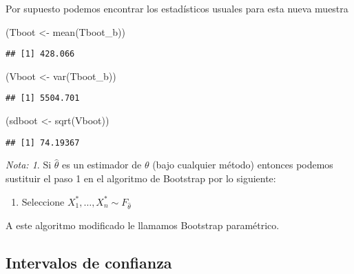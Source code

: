 \documentclass[
  12pt,
]{book}
\newenvironment{Shaded}{\begin{snugshade}}{\end{snugshade}}
\newcommand{\FunctionTok}[1]{\textcolor[rgb]{0.00,0.00,0.00}{#1}}
\newcommand{\NormalTok}[1]{#1}
\newcommand{\OtherTok}[1]{\textcolor[rgb]{0.56,0.35,0.01}{#1}}
\providecommand{\tightlist}{%
  \setlength{\itemsep}{0pt}\setlength{\parskip}{0pt}}
\theoremstyle{definition}
\theoremstyle{definition}
\theoremstyle{definition}
\theoremstyle{definition}
\theoremstyle{remark}
\newtheorem*{remark}{Nota: }
\begin{document}
Por supuesto podemos encontrar los estadísticos usuales para esta nueva muestra

\begin{Shaded}
\begin{Highlighting}[]
\NormalTok{(Tboot }\OtherTok{\textless{}{-}} \FunctionTok{mean}\NormalTok{(Tboot\_b))}
\end{Highlighting}
\end{Shaded}

\begin{verbatim}
## [1] 428.066
\end{verbatim}

\begin{Shaded}
\begin{Highlighting}[]
\NormalTok{(Vboot }\OtherTok{\textless{}{-}} \FunctionTok{var}\NormalTok{(Tboot\_b))}
\end{Highlighting}
\end{Shaded}

\begin{verbatim}
## [1] 5504.701
\end{verbatim}

\begin{Shaded}
\begin{Highlighting}[]
\NormalTok{(sdboot }\OtherTok{\textless{}{-}} \FunctionTok{sqrt}\NormalTok{(Vboot))}
\end{Highlighting}
\end{Shaded}

\begin{verbatim}
## [1] 74.19367
\end{verbatim}

\begin{remark}
Si \(\hat \theta\) es un estimador de \(\theta\) (bajo cualquier método) entonces podemos sustituir el paso 1 en el algoritmo de Bootstrap por lo siguiente:

\begin{enumerate}
\def\labelenumi{\arabic{enumi}.}
\tightlist
\item
  Seleccione \(X_{1}^{*}, \ldots, X_{n}^{*} \sim F_{\hat \theta}\)
\end{enumerate}

A este algoritmo modificado le llamamos Bootstrap paramétrico.
\end{remark}

\hypertarget{intervalos-de-confianza}{%
\subsection{Intervalos de confianza}\label{intervalos-de-confianza}}
\end{document}
